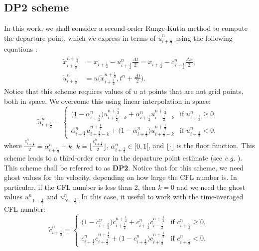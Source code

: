 \subsection{DP2 scheme}
\label{chp-adv1d-sec-DP2}
In this work, we shall
consider a second-order Runge-Kutta method to compute the departure point, which we express in terms of
$\tilde{u}^n_{i+\frac{1}{2}}$ using the following equations \citep{durran:2010}:
\begin{align}
	\label{chp-sec-flux:dp_DP2}
	\tilde{x}_{i+\frac{1}{2}}^{n+\frac{1}{2}} &= x_{i+\frac{1}{2}} - u_{i+\frac{1}{2}}^n
	 \frac{\Delta t}{2} = x_{i+\frac{1}{2}} - c_{i+\frac{1}{2}}^n \frac{\Delta x}{2}, \nonumber \\
	\tilde{u}^n_{i+\frac{1}{2}} &= u\bigg(\tilde{x}^{n+\frac{1}{2}}_{i+\frac{1}{2}}, t^n + \frac{\Delta t}{2}\bigg).
\end{align}
Notice that this scheme requires values of $u$ at points that are not grid points,
both in space. We overcome this using linear interpolation in space:
\begin{equation}
	\tilde{u}^n_{i+\frac{1}{2}} =
	\begin{cases}
		\big(1-\alpha_{i+\frac{1}{2}}^n \big)u^{n+\frac{1}{2}}_{i+\frac{1}{2}-k} +
        \alpha_{i+\frac{1}{2}}^n u^{n+\frac{1}{2}}_{i-\frac{1}{2}-k} & \text{if } {u}^n_{i+\frac{1}{2}}\geq 0,\\
		\alpha_{i+\frac{1}{2}}^n u^{n+\frac{1}{2}}_{i+\frac{3}{2}-k} + \big(1-\alpha_{i+\frac{1}{2}}^n\big)
        u^{n+\frac{1}{2}}_{i+\frac{1}{2}-k} & \text{if } {u}^n_{i+\frac{1}{2}} < 0,\
	\end{cases}
\end{equation}
where $\frac{c_{i+\frac{1}{2}}^n}{2} = \alpha_{i+\frac{1}{2}}^n + k$, 
$k=\lfloor \frac{c_{i+\frac{1}{2}}^n}{2} \rfloor$, $\alpha_{i+\frac{1}{2}}^n \in [0,1[$, and $\lfloor \cdot \rfloor$ is
the floor function. This scheme leads to a third-order error in the departure point estimate (see \textit{e.g.} 
\citet[Section 7.1.2]{durran:2010}). This scheme shall be referred to as \textbf{DP2}. 
Notice that for this scheme, we need ghost values for the velocity, depending on how large the CFL number is.
In particular, if the CFL number is less than 2, then $k=0$ and we need the ghost values $u_{-1+\frac{1}{2}}^n$ and $u_{N+\frac{3}{2}}^n$.
In this case, it useful to work with the time-averaged CFL number:
\begin{equation}
	\tilde{c}^n_{i+\frac{1}{2}} =
	\begin{cases}
		\big(1-c_{i+\frac{1}{2}}^n \big)c^{n+\frac{1}{2}}_{i+\frac{1}{2}} +
      c_{i+\frac{1}{2}}^n c^{n+\frac{1}{2}}_{i-\frac{1}{2}} & \text{if } {c}^n_{i+\frac{1}{2}}\geq 0,\\
		c_{i+\frac{1}{2}}^n c^{n+\frac{1}{2}}_{i+\frac{3}{2}} + \big(1-c_{i+\frac{1}{2}}^n\big)
        c^{n+\frac{1}{2}}_{i+\frac{1}{2}} & \text{if } {c}^n_{i+\frac{1}{2}} < 0.\
	\end{cases}
\end{equation}

